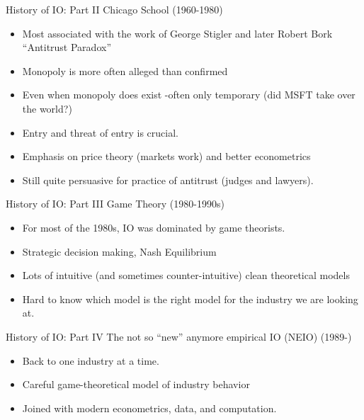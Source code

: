 \documentclass[xcolor=pdftex,dvipsnames,table,mathserif,aspectratio=169]{beamer}
\begin{document}
\begin{frame}{History of IO: Part II}
Chicago School (1960-1980)
\begin{itemize}
\item Most associated with the work of George Stigler and later Robert Bork ``Antitrust Paradox''
\item Monopoly is more often alleged than confirmed
\item Even when monopoly does exist -often only temporary (did MSFT take over the world?)
\item Entry and threat of entry is crucial.
\item Emphasis on price theory (markets work) and better econometrics
\item Still quite persuasive for practice of antitrust (judges and lawyers).
\end{itemize}
\end{frame}


\begin{frame}{History of IO: Part III}
Game Theory (1980-1990s)
\begin{itemize}
\item For most of the 1980s, IO was dominated by game theorists.
\item Strategic decision making, Nash Equilibrium
\item Lots of intuitive (and sometimes counter-intuitive) clean theoretical models
\item Hard to know which model is the right model for the industry we are looking at.
\end{itemize}
\end{frame}


\begin{frame}{History of IO: Part IV}
The not so ``new'' anymore empirical IO (NEIO) (1989-)
\begin{itemize}
\item Back to one industry at a time.
\item Careful game-theoretical model of industry behavior
\item Joined with modern econometrics, data, and computation.
\end{itemize}
\end{frame}
\end{document}
